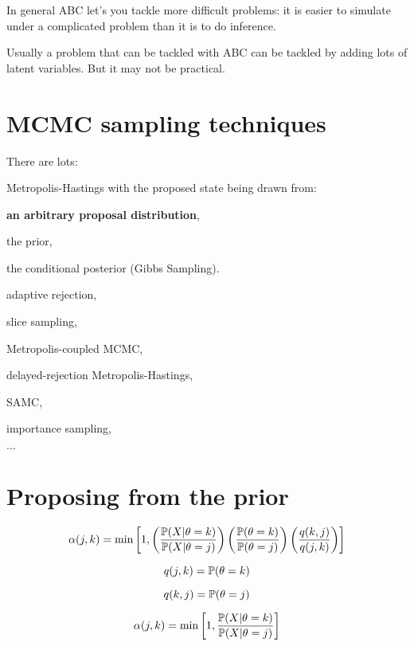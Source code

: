 In general ABC let's you tackle more difficult problems: it is easier to simulate under a complicated problem than it is to do inference.

Usually a problem that can be tackled with ABC can be tackled by adding lots of latent variables. 
But it may not be practical.


\myNewSlide
\section*{MCMC sampling techniques}
\large
There are lots:
\begin{compactitem}
	\item Metropolis-Hastings with the proposed state being drawn from:
	 \begin{compactitem}
		\item {\bf an arbitrary proposal distribution},
		\item the prior,
		\item the conditional posterior (Gibbs Sampling).
	\end{compactitem}
	\item adaptive rejection,
	\item slice sampling,
	\item Metropolis-coupled MCMC, 
	\item delayed-rejection Metropolis-Hastings,
	\item SAMC,
	\item importance sampling,
	\item $\ldots$
\end{compactitem}

\myNewSlide
\section*{Proposing from the prior}
\begin{eqnarray*}
	\alpha({j,k}) = \min\left[1, \left(\frac{\mathbb{P}(X|\theta=k)}{\mathbb{P}(X|\theta=j)}\right)\left(\frac{\mathbb{P}(\theta=k)}{\mathbb{P}(\theta=j)}\right)\left(\frac{q(k,j)}{q(j,k)}\right)\right]
\end{eqnarray*}

$$ q(j,k) = \mathbb{P}(\theta=k)$$

$$ q(k,j) = \mathbb{P}(\theta=j)$$

\begin{eqnarray*}
	\alpha({j,k}) = \min\left[1, \frac{\mathbb{P}(X|\theta=k)}{\mathbb{P}(X|\theta=j)}\right]
\end{eqnarray*}

